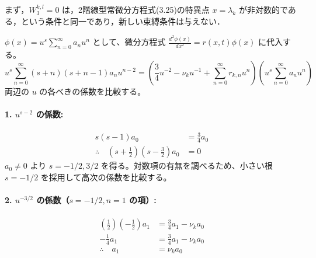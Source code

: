 \documentclass[paper=a4, fontsize=11pt]{jlreq} %
\newenvironment{story}{%
  \begin{mdframed}[
    backgroundcolor=red!5, %
    linewidth=0pt,         %
    innertopmargin=10pt,   %
    innerbottommargin=10pt,
    innerrightmargin=10pt, %
    innerleftmargin=10pt
  ]%
}{%
  \end{mdframed}%
}
\theoremstyle{break}
\theoremstyle{qa}
\begin{document}
\begin{story}
まず，$W_3^{k,l}=0$ は，2階線型常微分方程式(3.25)の特異点 $x=\lambda_k$ が非対数的である，という条件と同一であり，新しい束縛条件は与えない．
\end{story}
$\phi(x) = u^s \sum_{n=0}^\infty a_n u^n$ として、微分方程式 $\frac{d^2\phi(x)}{dx^2} = r(x,t)\phi(x)$ に代入する。
\begin{equation*}
    u^s \sum_{n=0}^\infty (s+n)(s+n-1) a_n u^{n-2} = \left( \frac{3}{4} u^{-2} - \nu_k u^{-1} + \sum_{n=0}^\infty r_{k,n} u^n \right) \left( u^s \sum_{n=0}^\infty a_n u^n \right)
\end{equation*}
両辺の $u$ の各べきの係数を比較する。

\paragraph{1. $u^{s-2}$ の係数:}
\begin{align*}
    s(s-1) a_0 &= \frac{3}{4} a_0 \\
    \therefore \quad \left(s + \frac{1}{2}\right)\left(s - \frac{3}{2}\right) a_0 &= 0
\end{align*}
$a_0 \neq 0$ より $s = -1/2, 3/2$ を得る。対数項の有無を調べるため、小さい根 $s = -1/2$ を採用して高次の係数を比較する。

\paragraph{2. $u^{-3/2}$ の係数（$s=-1/2, n=1$ の項）:}
\begin{align*}
    \left(\frac{1}{2}\right)\left(-\frac{1}{2}\right) a_1 &= \frac{3}{4} a_1 - \nu_k a_0 \\
    -\frac{1}{4} a_1 &= \frac{3}{4} a_1 - \nu_k a_0 \\
    \therefore \quad a_1 &= \nu_k a_0
\end{align*}
\end{document}
